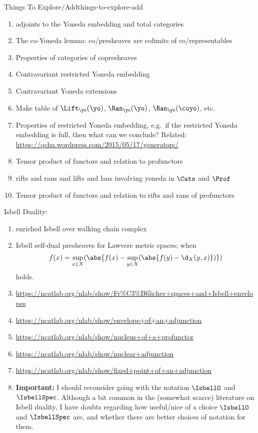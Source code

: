 \begin{remark}{Things To Explore/Add}{things-to-explore-add}
\begin{enumerate}
        \item adjoints to the Yoneda embedding and total categories
        \item The co-Yoneda lemma: co/presheaves are colimits of co/representables
        \item Properties of categories of copresheaves
        \item Contravariant restricted Yoneda embedding
        \item Contravariant Yoneda extensions
        \item Make table of $\Lift_{\yo}(\yo)$, $\Ran_{\yo}(\yo)$, $\Ran_{\yo}(\coyo)$, etc.
        \item Properties of restricted Yoneda embedding, e.g.\ if the restricted Yoneda embedding is full, then what can we conclude? Related: \url{https://qchu.wordpress.com/2015/05/17/generators/}
        \item Tensor product of functors and relation to profunctors
        \item rifts and rans and lifts and lans involving yoneda in $\Cats$ and $\Prof$
        \item Tensor product of functors and relation to rifts and rans of profunctors
    \end{enumerate}
    Isbell Duality:
    \begin{enumerate}
        \item enriched Isbell over walking chain complex
        \item Isbell self-dual presheaves for Lawvere metric spaces; when
            \[
                f(x)%
                =%
                \sup_{x\in X}(\abs{f(x)-\sup_{y\in X}(\abs{f(y)-\d_{X}(y,x)})})%
            \]%
            holds.
        \item \url{https://ncatlab.org/nlab/show/Fr\%C3\%B6licher+spaces+and+Isbell+envelopes}
        \item \url{https://ncatlab.org/nlab/show/envelope+of+an+adjunction}
        \item \url{https://ncatlab.org/nlab/show/nucleus+of+a+profunctor}
        \item \url{https://ncatlab.org/nlab/show/nuclear+adjunction}
        \item \url{https://ncatlab.org/nlab/show/fixed+point+of+an+adjunction}
        \item \textbf{Important: }I should reconsider going with the notation $\IsbellO$ and $\IsbellSpec$. Although a bit common in the (somewhat scarce) literature on Isbell duality, I have doubts regarding how useful/nice of a choice $\IsbellO$ and $\IsbellSpec$ are, and whether there are better choices of notation for them.

\end{enumerate}
\end{remark}
